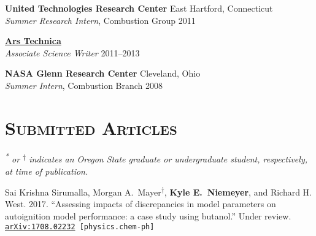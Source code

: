 \documentclass[margin,line,11pt]{res}
\makeatletter
\newlength{\bibhang}
\newlength{\bibsep}
 {\@listi \global\bibsep\itemsep \global\advance\bibsep by\parsep}
\newenvironment{bibenum*}
  {\renewcommand\labelenumi{\theenumi.}%
   \etaremune[
     topsep=0pt,
     itemsep=\bibsep,
     parsep=0pt,partopsep=0pt,
     itemindent=-\bibhang,
     leftmargin={\bibhang+\widthof{[999]}}]}
  {\endetaremune}
\newcommand*{\grad}[0]{\textsuperscript{*}}
\newcommand*{\ugrad}[0]{\textsuperscript{$\dagger$}}
\makeatother
\begin{document}
\begin{resume}
\textbf{United Technologies Research Center} \hfill East Hartford, Connecticut \\
\emph{Summer Research Intern}, Combustion Group \hfill 2011

\textbf{\href{http://arstechnica.com/}{Ars Technica}} \\
\emph{Associate Science Writer} \hfill 2011--2013

\textbf{NASA Glenn Research Center} \hfill Cleveland, Ohio \\
\emph{Summer Intern}, Combustion Branch \hfill 2008

\section{\textsc{Submitted Articles}}

\textit{\grad{} or \ugrad{} indicates an Oregon State
graduate or undergraduate student, respectively, at time of publication.}
\\

\begin{bibenum*}

\item Sai Krishna Sirumalla, Morgan A.~Mayer\ugrad{}, \textbf{Kyle E.~Niemeyer}, and Richard H. West.
2017.
``Assessing impacts of discrepancies in model parameters on autoignition model performance: a case study using butanol.''
Under review. {\tt \href{https://arxiv.org/abs/1708.02232}{arXiv:1708.02232} [physics.chem-ph]}


\end{bibenum*}
\end{resume}
\end{document}
